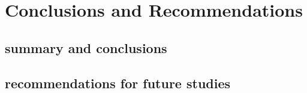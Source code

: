\section{Conclusions and Recommendations}




\subsection{summary and conclusions}
\subsection{recommendations for future studies}